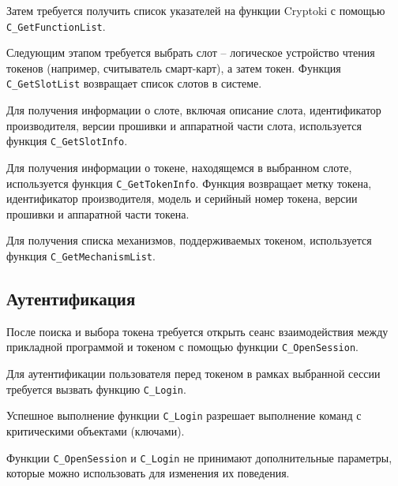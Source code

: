 Затем требуется получить список указателей на функции Cryptoki
с помощью \verb|C_GetFunctionList|.

Следующим этапом требуется выбрать слот -- логическое
устройство чтения токенов (например, считыватель смарт-карт),
а затем токен.
Функция \verb|C_GetSlotList| возвращает список слотов в системе.

Для получения информации о слоте, включая описание слота,
идентификатор производителя, версии прошивки и аппаратной
части слота, используется функция \verb|C_GetSlotInfo|.

Для получения информации о токене, находящемся в выбранном
слоте, используется функция \verb|C_GetTokenInfo|.
Функция возвращает метку токена, идентификатор производителя,
модель и серийный номер токена, версии прошивки и
аппаратной части токена.

Для получения списка механизмов, поддерживаемых токеном,
используется функция \verb|C_GetMechanismList|.


\subsection{Аутентификация}

После поиска и выбора токена требуется открыть сеанс
взаимодействия между прикладной программой и токеном с
помощью функции \verb|C_OpenSession|.

Для аутентификации пользователя перед токеном в рамках
выбранной сессии требуется вызвать функцию \verb|C_Login|.

Успешное выполнение функции \verb|C_Login| разрешает
выполнение команд с критическими объектами (ключами).

Функции \verb|C_OpenSession| и \verb|C_Login| не принимают
дополнительные параметры, которые можно использовать для
изменения их поведения.

